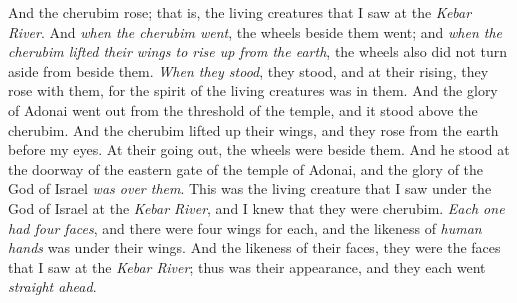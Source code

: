 \begin{biblechapter}
\verse And the cherubim rose; that is, the living creatures that I saw at the \textit{Kebar River}.
\verse And \textit{when the cherubim went}, the wheels beside them went; and \textit{when the cherubim lifted their wings to rise up from the earth}, the wheels also did not turn aside from beside them.
\verse \textit{When they stood}, they stood, and at their rising, they rose with them, for the spirit of the living creatures was in them.
\verse And the glory of Adonai went out from the threshold of the temple, and it stood above the cherubim.
\verse And the cherubim lifted up their wings, and they rose from the earth before my eyes. At their going out, the wheels were beside them. And he stood at the doorway of the eastern gate of the temple of Adonai, and the glory of the God of Israel \textit{was over them}.
\verse This was the living creature that I saw under the God of Israel at the \textit{Kebar River}, and I knew that they were cherubim.
\verse \textit{Each one had four faces}, and there were four wings for each, and the likeness of \textit{human hands} was under their wings.
\verse And the likeness of their faces, they were the faces that I saw at the \textit{Kebar River}; thus was their appearance, and they each went \textit{straight ahead}.
\end{biblechapter}

